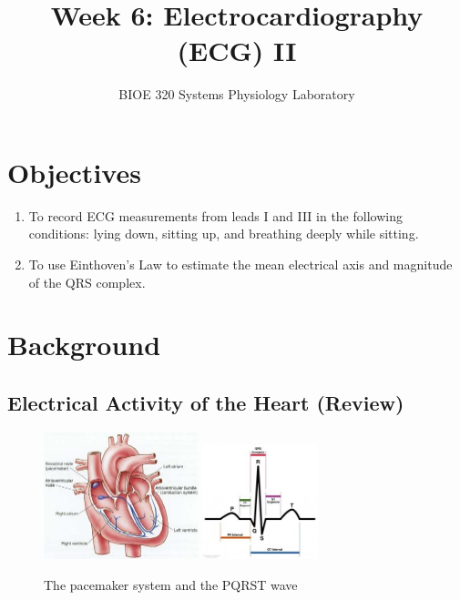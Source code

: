 \documentclass{article}
\title{Week 6: Electrocardiography (ECG) II}
\author{BIOE 320 Systems Physiology Laboratory}
\date{}
\begin{document}
\large
\maketitle

\section*{Objectives}
\begin{enumerate}
	\item To record ECG measurements from leads I and III in the following conditions: lying down, sitting up, and breathing deeply while sitting.
	\item To use Einthoven's Law to estimate the mean electrical axis and magnitude of the QRS complex.
\end{enumerate}

\section*{Background}


\subsection*{Electrical Activity of the Heart (Review)}
\begin{figure}[h]
\centering\includegraphics[width=0.4\textwidth]{../images/ECG_II_1a.jpg}
\centering\includegraphics[width=0.3\textwidth]{../images/ECG_II_1b.jpg}
\caption{The pacemaker system and the PQRST wave}
\label{pacemaker}
\end{figure}
\end{document}
